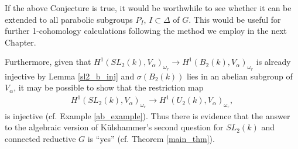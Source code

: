 If the above Conjecture is true, it would be worthwhile to see whether it can be extended to all parabolic subgroups $P_I$, $I\subset \Delta$ of $G$. This would be useful for further 1-cohomology calculations following the method we employ in the next Chapter.

Furthermore, given that $H^1(SL_2(k), V_\alpha)_{\omega_r}\rightarrow H^1(B_2(k), V_\alpha)_{\omega_r}$ is already injective by Lemma \ref{sl2_b_inj} and $\sigma\left(B_2(k)\right)$ lies in an abelian subgroup of $V_\alpha$, it may be possible to show that the restriction map
\begin{align*}
	H^1(SL_2(k), V_\alpha)_{\omega_r} \rightarrow H^1(U_2(k), V_\alpha)_{\omega_r},
\end{align*}
is injective (cf. Example \ref{ab_example}). Thus there is evidence that the answer to the algebraic version of K\"ulshammer's second question for $SL_2(k)$ and connected reductive $G$ is ``yes'' (cf. Theorem \ref{main_thm}).
